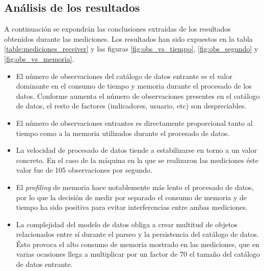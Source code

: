 \subsection{Análisis de los resultados}
	A continuación se expondrán las conclusiones extraídas de los resultados obtenidos durante las mediciones. Los resultados han sido expuestos en la tabla \ref{table:mediciones_receiver} y las figuras \ref{fig:obs_vs_tiempo}, \ref{fig:obs_segundo} y \ref{fig:obs_vs_memoria}.
	\begin{itemize}
		\item
			El número de observaciones del catálogo de datos entrante es el valor dominante en el consumo de tiempo y memoria durante el procesado de los datos.  Conforme aumenta el número de observaciones presentes en el catálogo de datos, el resto de factores (indicadores, usuario, etc) son despreciables.
		\item
			El número de observaciones entrantes es directamente proporcional tanto al tiempo como a la memoria utilizados durante el procesado de datos. 
		\item
			La velocidad de procesado de datos tiende a estabilizarse en torno a un valor concreto.  En el caso de la máquina en la que se realizaron las mediciones éste valor fue de 105 observaciones por segundo.
		\item
			El \textit{profiling} de memoria hace notablemente más lento el procesado de datos, por lo que la decisión de medir por separado el consumo de memoria y de tiempo ha sido positiva para evitar interferencias entre ambas mediciones.
		\item
			La complejidad del modelo de datos obliga a crear multitud de objetos relacionados entre sí durante el parseo y la persistencia del catálogo de datos.  Ésto provoca el alto consumo de memoria mostrado en las mediciones, que en varias ocasiones llega a multiplicar por un factor de 70 el tamaño del catálogo de datos entrante.
	\end{itemize}
